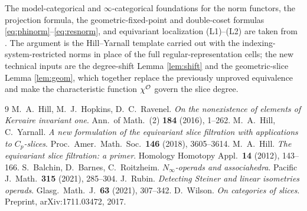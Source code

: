 The model-categorical and $\infty$-categorical foundations for the
norm functors, the projection formula, the geometric-fixed-point and double-coset
formulas \eqref{eq:phinorm}--\eqref{eq:resnorm}, and equivariant localization
(L1)--(L2) are taken from \cite{HHR16, HillPrimer, BBR, Rubin}. The argument is the
Hill--Yarnall template \cite{HY18} carried out with the
indexing-system-restricted norms in place of the full regular-representation
cells; the new technical inputs are the degree-shift Lemma \ref{lem:shift} and the
geometric-slice Lemma \ref{lem:geom}, which together replace the previously
unproved equivalence and make the characteristic function $\chi^{\mathcal{O}}$ govern the
slice degree.

\begin{thebibliography}{9}
 M.~A.~Hill, M.~J.~Hopkins, D.~C.~Ravenel.
  \emph{On the nonexistence of elements of Kervaire invariant one}.
  Ann.\ of Math.\ (2) \textbf{184} (2016), 1--262.
 M.~A.~Hill, C.~Yarnall.
  \emph{A new formulation of the equivariant slice filtration with applications
  to $C_p$-slices}. Proc.\ Amer.\ Math.\ Soc.\ \textbf{146} (2018), 3605--3614.
 M.~A.~Hill.
  \emph{The equivariant slice filtration: a primer}.
  Homology Homotopy Appl.\ \textbf{14} (2012), 143--166.
 S.~Balchin, D.~Barnes, C.~Roitzheim.
  \emph{$N_\infty$-operads and associahedra}.
  Pacific J.\ Math.\ \textbf{315} (2021), 285--304.
 J.~Rubin.
  \emph{Detecting Steiner and linear isometries operads}.
  Glasg.\ Math.\ J.\ \textbf{63} (2021), 307--342.
 D.~Wilson.
  \emph{On categories of slices}. Preprint, arXiv:1711.03472, 2017.
\end{thebibliography}

\endgroup